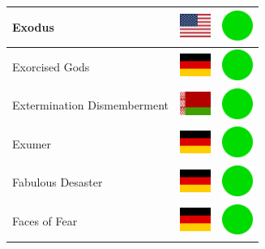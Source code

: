 \documentclass[12pt, a4paper, twoside]{report}
\begin{document}
\begin{center}
\begin{longtable}{|p{5cm}|p{2cm}|p{2cm}|}
 Exodus                                                     & \includegraphics[width=1cm]{../4x3/us} &   \includegraphics[width=1cm]{../likes/y} \\ \hline
 Exorcised Gods                                             & \includegraphics[width=1cm]{../4x3/de} &   \includegraphics[width=1cm]{../likes/y} \\ \hline
 Extermination Dismemberment                                & \includegraphics[width=1cm]{../4x3/by} &   \includegraphics[width=1cm]{../likes/y} \\ \hline
 Exumer                                                     & \includegraphics[width=1cm]{../4x3/de} &   \includegraphics[width=1cm]{../likes/y} \\ \hline
 Fabulous Desaster                                          & \includegraphics[width=1cm]{../4x3/de} &   \includegraphics[width=1cm]{../likes/y} \\ \hline
 Faces of Fear                                              & \includegraphics[width=1cm]{../4x3/de} &   \includegraphics[width=1cm]{../likes/y} \\ \hline

\end{longtable}
\end{center}
\end{document}
